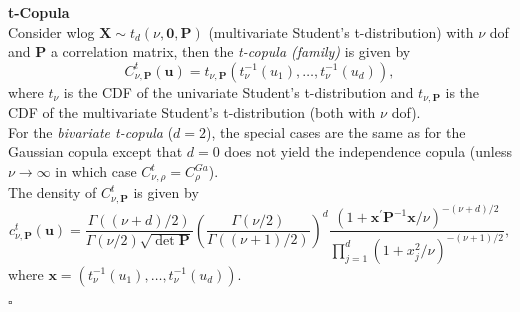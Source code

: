 \textbf{t-Copula}\\
Consider \ac{wlog} $\bm{X} \sim {t_{d}(\nu, \bm{0}, \mathbf{P})}$ (multivariate Student's t-distribution) with $\nu$ \ac{dof} and $\bm{P}$ a correlation matrix, then the \textit{t-copula (family)} is given by
\begin{equation}
C_{\nu, \bm{P}}^{t}(\mathbf{u})=t_{\nu, \bm{P}}\left(t_{\nu}^{-1}\left(u_{1}\right), \ldots, t_{\nu}^{-1}\left(u_{d}\right)\right),
\end{equation}
where $t_{\nu}$ is the \ac{CDF} of the univariate Student's t-distribution  and $t_{\nu, \bm{P}}$ is the \ac{CDF} of the multivariate Student's t-distribution (both with $\nu$ \ac{dof}).\\
For the \textit{bivariate t-copula} ($d=2$), the special cases are the same as for the Gaussian copula except that $d=0$ does not yield the independence copula (unless $\nu \rightarrow \infty$ in which case  $ C_{\nu, \rho}^{t} = C_{\rho}^{G a}$).\\
The density of $C_{\nu, \bm{P}}^{t}$ is given by
\begin{equation}
c_{\nu, \mathbf{P}}^{t}(\boldsymbol{u})=\frac{\Gamma((\nu+d) / 2)}{\Gamma(\nu / 2) \sqrt{\operatorname{det} \mathbf{P}}}\left(\frac{\Gamma(\nu / 2)}{\Gamma((\nu+1) / 2)}\right)^{d} \frac{\left(1+\boldsymbol{x}^{\prime} \mathbf{P}^{-1} \boldsymbol{x} / \nu\right)^{-(\nu+d) / 2}}{\prod_{j=1}^{d}\left(1+x_{j}^{2} / \nu\right)^{-(\nu+1) / 2}},
\end{equation}
where $\bm{x} = \left(t_{\nu}^{-1}\left(u_{1}\right), \ldots, t_{\nu}^{-1}\left(u_{d}\right)\right)$.

\hfill $\square$ \\












